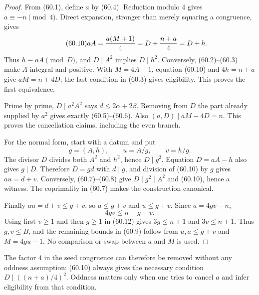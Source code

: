 \documentclass[10pt,reqno]{amsart}
\theoremstyle{definition}
\newcommand{\1}{\mathbf 1}
\begin{document}
\begin{proof}
From (60.1), define $a$ by (60.4).  Reduction modulo $4$ gives
$a\equiv-n\pmod4$.  Direct expansion, stronger than merely squaring a
congruence, gives
\begin{equation}\tag{60.10}
 aA={a(M+1)\over4}=D+{n+a\over4}=D+h.
\end{equation}
Thus $h\equiv aA\pmod D$, and $D\mid A^2$ implies $D\mid h^2$.
Conversely, (60.2)--(60.3) make $A$ integral and positive.  With $M=4A-1$,
equation (60.10) and $4h=n+a$ give $aM=n+4D$; the last condition in
(60.3) gives eligibility.  This proves the first equivalence.

Prime by prime, $D\mid a^2A^2$ says $d\leq2\alpha+2\beta$.  Removing from
$D$ the part already supplied by $a^2$ gives exactly (60.5)--(60.6).  Also
$(a,D)\mid aM-4D=n$.  This proves the cancellation claims, including the
even branch.

For the normal form, start with a datum and put
\begin{equation}\tag{60.11}
 g=(A,h),\qquad u=A/g,\qquad v=h/g.
\end{equation}
The divisor $D$ divides both $A^2$ and $h^2$, hence $D\mid g^2$.
Equation $D=aA-h$ also gives $g\mid D$.  Therefore $D=gd$ with $d\mid g$,
and division of (60.10) by $g$ gives $au=d+v$.  Conversely,
(60.7)--(60.8) give $D\mid g^2\mid A^2$ and (60.10), hence a witness.  The
coprimality in (60.7) makes the construction canonical.

Finally $au=d+v\leq g+v$, so $a\leq g+v$ and $u\leq g+v$.  Since
$a=4gv-n$,
\begin{equation}\tag{60.12}
 4gv\leq n+g+v.
\end{equation}
Using first $v\geq1$ and then $g\geq1$ in (60.12) gives $3g\leq n+1$ and
$3v\leq n+1$.  Thus $g,v\leq B$, and the remaining bounds in (60.9) follow
from $u,a\leq g+v$ and $M=4gu-1$.  No comparison or swap between $a$ and
$M$ is used.
\end{proof}

The factor $4$ in the seed congruence can therefore be removed without any
oddness assumption: (60.10) always gives the necessary condition
$D\mid((n+a)/4)^2$.  Oddness matters only when one tries to cancel $a$ and
infer eligibility from that condition.
\end{document}
